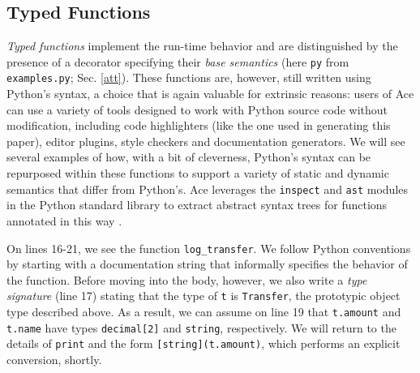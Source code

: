 \documentclass[10pt,preprint]{sigplanconf}
\begin{document}
\subsection{Typed Functions}

\emph{Typed functions} implement the run-time behavior and are distinguished by the presence of a decorator specifying their  \emph{base semantics} (here \verb|py| from \verb|examples.py|; Sec. \ref{att}). These functions are, however, still written using Python's syntax, a choice that is again valuable for extrinsic reasons: users of Ace can use a variety of  tools designed to work with Python source code  without  modification, including code highlighters (like the one used in generating this paper), editor plugins, style checkers and documentation generators. We will see several examples of how, with a bit of cleverness, Python's syntax can be repurposed within these functions to support a variety of static and dynamic semantics that differ from Python's. Ace  leverages the \verb|inspect| and \verb|ast| modules in the Python standard library to extract abstract syntax trees for functions annotated in this way \cite{python}. 

On lines 16-21, we see the function \verb|log_transfer|. We follow Python conventions by starting with a documentation string  that informally specifies the behavior of the function. Before moving into the body, however, we  also write a \emph{type signature} (line 17) stating that the type of \verb|t| is \verb|Transfer|, the prototypic object type described above. As a result, we can assume on line 19 that \verb|t.amount| and \verb|t.name| have types \verb|decimal[2]| and \verb|string|, respectively. We will return to the details of \verb|print| and the form \verb|[string](t.amount)|, which performs an explicit conversion, shortly.
\end{document}
